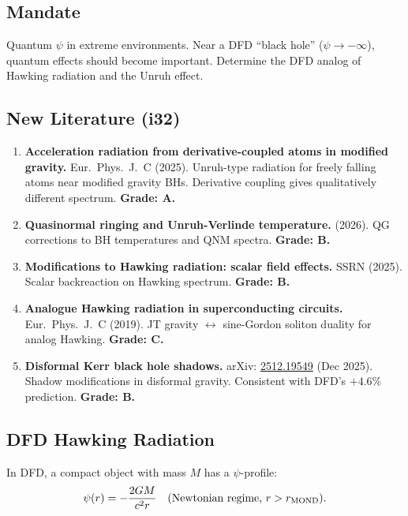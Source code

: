 \documentclass[11pt,a4paper]{article}
\begin{document}
\subsection{Mandate}

Quantum $\psi$ in extreme environments. Near a DFD ``black hole'' ($\psi \to -\infty$), quantum effects should become important. Determine the DFD analog of Hawking radiation and the Unruh effect.

\subsection{New Literature (i32)}

\begin{enumerate}
\item \textbf{Acceleration radiation from derivative-coupled atoms in modified gravity.} Eur.\ Phys.\ J.\ C (2025). Unruh-type radiation for freely falling atoms near modified gravity BHs. Derivative coupling gives qualitatively different spectrum. \textbf{Grade: A.}

\item \textbf{Quasinormal ringing and Unruh-Verlinde temperature.} (2026). QG corrections to BH temperatures and QNM spectra. \textbf{Grade: B.}

\item \textbf{Modifications to Hawking radiation: scalar field effects.} SSRN (2025). Scalar backreaction on Hawking spectrum. \textbf{Grade: B.}

\item \textbf{Analogue Hawking radiation in superconducting circuits.} Eur.\ Phys.\ J.\ C (2019). JT gravity $\leftrightarrow$ sine-Gordon soliton duality for analog Hawking. \textbf{Grade: C.}

\item \textbf{Disformal Kerr black hole shadows.} arXiv: \href{https://arxiv.org/abs/2512.19549}{2512.19549} (Dec 2025). Shadow modifications in disformal gravity. Consistent with DFD's $+4.6\%$ prediction. \textbf{Grade: B.}
\end{enumerate}

\subsection{DFD Hawking Radiation}
\label{sec:hawking}

In DFD, a compact object with mass $M$ has a $\psi$-profile:
\begin{equation}
\psi(r) = -\frac{2GM}{c^2 r}\quad\text{(Newtonian regime, $r > r_{\rm MOND}$)}.
\end{equation}
\end{document}
